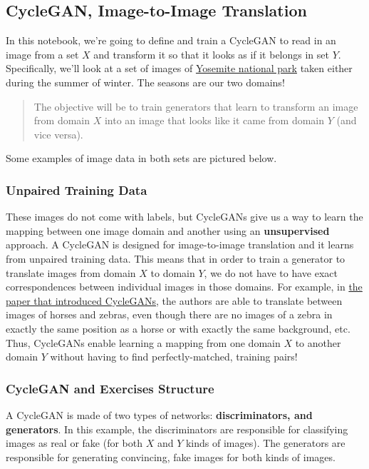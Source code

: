 \subsection{CycleGAN, Image-to-Image Translation}

In this notebook, we're going to define and train a CycleGAN to read in
an image from a set \(X\) and transform it so that it looks as if it
belongs in set \(Y\). Specifically, we'll look at a set of images of
\href{https://en.wikipedia.org/wiki/Yosemite_National_Park}{Yosemite
national park} taken either during the summer of winter. The seasons are
our two domains!

\begin{quote}
The objective will be to train generators that learn to transform an
image from domain \(X\) into an image that looks like it came from
domain \(Y\) (and vice versa).
\end{quote}

Some examples of image data in both sets are pictured below.

\subsubsection{Unpaired Training Data}

These images do not come with labels, but CycleGANs give us a way to
learn the mapping between one image domain and another using an
\textbf{unsupervised} approach. A CycleGAN is designed for
image-to-image translation and it learns from unpaired training data.
This means that in order to train a generator to translate images from
domain \(X\) to domain \(Y\), we do not have to have exact
correspondences between individual images in those domains. For example,
in \href{https://arxiv.org/abs/1703.10593}{the paper that introduced
CycleGANs}, the authors are able to translate between images of horses
and zebras, even though there are no images of a zebra in exactly the
same position as a horse or with exactly the same background, etc. Thus,
CycleGANs enable learning a mapping from one domain \(X\) to another
domain \(Y\) without having to find perfectly-matched, training pairs!

\subsubsection{CycleGAN and Exercises Structure}
A CycleGAN is made of two types of networks: \textbf{discriminators, and
generators}. In this example, the discriminators are responsible for
classifying images as real or fake (for both \(X\) and \(Y\) kinds of
images). The generators are responsible for generating convincing, fake
images for both kinds of images. \newline

